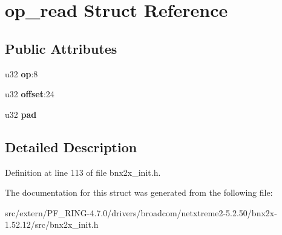 \hypertarget{structop__read}{
\section{op\_\-read Struct Reference}
\label{structop__read}
}
\subsection*{Public Attributes}
\begin{DoxyCompactItemize}
\item 
\hypertarget{structop__read_aaa428a71724938f5bd1e2ab721c09889}{
u32 {\bfseries op}:8}
\label{structop__read_aaa428a71724938f5bd1e2ab721c09889}

\item 
\hypertarget{structop__read_aa23806749d53c9b992a2cfacf582f961}{
u32 {\bfseries offset}:24}
\label{structop__read_aa23806749d53c9b992a2cfacf582f961}

\item 
\hypertarget{structop__read_a3695fabe2e6d37846da4998849423b32}{
u32 {\bfseries pad}}
\label{structop__read_a3695fabe2e6d37846da4998849423b32}

\end{DoxyCompactItemize}


\subsection{Detailed Description}


Definition at line 113 of file bnx2x\_\-init.h.



The documentation for this struct was generated from the following file:\begin{DoxyCompactItemize}
\item 
src/extern/PF\_\-RING-\/4.7.0/drivers/broadcom/netxtreme2-\/5.2.50/bnx2x-\/1.52.12/src/bnx2x\_\-init.h\end{DoxyCompactItemize}

